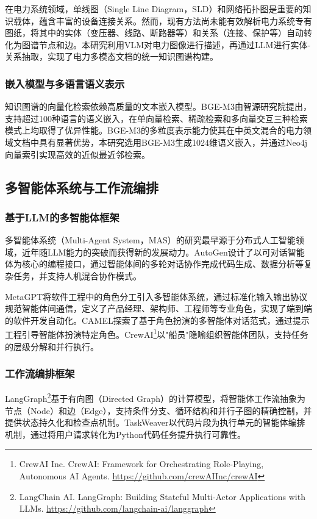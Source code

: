 在电力系统领域，单线图（Single Line Diagram，SLD）和网络拓扑图是重要的知识载体，蕴含丰富的设备连接关系。然而，现有方法尚未能有效解析电力系统专有图纸，将其中的实体（变压器、线路、断路器等）和关系（连接、保护等）自动转化为图谱节点和边。本研究利用VLM对电力图像进行描述，再通过LLM进行实体-关系抽取，实现了电力多模态文档的统一知识图谱构建。

\subsubsection{嵌入模型与多语言语义表示}

知识图谱的向量化检索依赖高质量的文本嵌入模型。BGE-M3\cite{chen2024bgem3}由智源研究院提出，支持超过100种语言的语义嵌入，在单向量检索、稀疏检索和多向量交互三种检索模式上均取得了优异性能。BGE-M3的多粒度表示能力使其在中英文混合的电力领域文档中具有显著优势，本研究选用BGE-M3生成1024维语义嵌入，并通过Neo4j向量索引实现高效的近似最近邻检索。

\subsection{多智能体系统与工作流编排}

\subsubsection{基于LLM的多智能体框架}

多智能体系统（Multi-Agent System，MAS）的研究最早源于分布式人工智能领域，近年随LLM能力的突破而获得新的发展动力。AutoGen\cite{wu2023autogen}设计了以可对话智能体为核心的编程接口，通过智能体间的多轮对话协作完成代码生成、数据分析等复杂任务，并支持人机混合协作模式。

MetaGPT\cite{hong2023metagpt}将软件工程中的角色分工引入多智能体系统，通过标准化输入输出协议规范智能体间通信，定义了产品经理、架构师、工程师等专业角色，实现了端到端的软件开发自动化。CAMEL\cite{li2023camel}探索了基于角色扮演的多智能体对话范式，通过提示工程引导智能体扮演特定角色。CrewAI\footnote{CrewAI Inc. CrewAI: Framework for Orchestrating Role-Playing, Autonomous AI Agents. \url{https://github.com/crewAIInc/crewAI}}以"船员"隐喻组织智能体团队，支持任务的层级分解和并行执行。

\subsubsection{工作流编排框架}

LangGraph\footnote{LangChain AI. LangGraph: Building Stateful Multi-Actor Applications with LLMs. \url{https://github.com/langchain-ai/langgraph}}基于有向图（Directed Graph）的计算模型，将智能体工作流抽象为节点（Node）和边（Edge），支持条件分支、循环结构和并行子图的精确控制，并提供状态持久化和检查点机制。TaskWeaver\cite{taskweaver2024}以代码片段为执行单元的智能体编排机制，通过将用户请求转化为Python代码任务提升执行可靠性。

